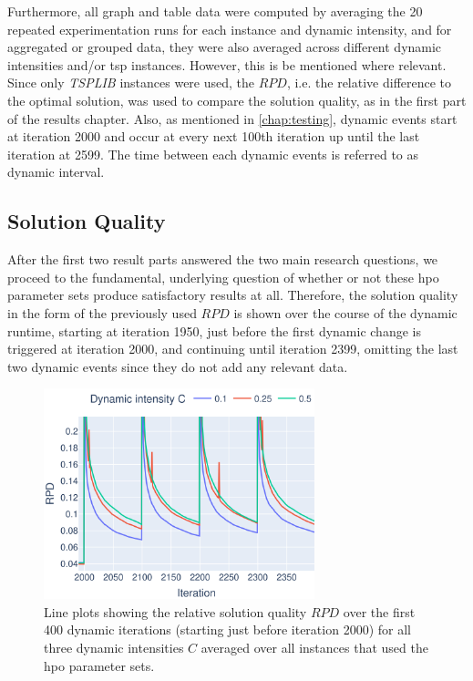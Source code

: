 Furthermore, all graph and table data were computed by averaging the 20 repeated experimentation runs for each instance and dynamic intensity, and for aggregated or grouped data, they were also averaged across different dynamic intensities and/or \gls{tsp} instances. However, this is be mentioned where relevant. Since only \textit{TSPLIB} instances were used, the $RPD$, i.e. the relative difference to the optimal solution, was used to compare the solution quality, as in the first part of the results chapter. Also, as mentioned in \cref{chap:testing}, dynamic events start at iteration 2000 and occur at every next 100th iteration up until the last iteration at 2599. The time between each dynamic events is referred to as dynamic interval.

\subsection{Solution Quality}

After the first two result parts answered the two main research questions, we proceed to the fundamental, underlying question of whether or not these \gls{hpo} parameter sets produce satisfactory results at all. Therefore, the solution quality in the form of the previously used $RPD$ is shown over the course of the dynamic runtime, starting at iteration 1950, just before the first dynamic change is triggered at iteration 2000, and continuing until iteration 2399, omitting the last two dynamic events since they do not add any relevant data. 


\begin{figure}[h]
	\centering
	\includegraphics[width=0.7\textwidth]{results/part3/run_plot_cmp_dynamic_aggr_None_y_best_solution_1_to_30_HPO.svg}
	\caption[Line plots showing the $RPD$ over the dynamic iterations for all three dynamic intensities $C$]{Line plots showing the relative solution quality $RPD$ over the first 400 dynamic iterations (starting just before iteration 2000) for all three dynamic intensities $C$ averaged over all instances that used the \gls{hpo} parameter sets.}
	\label{fig:run_plot_cmp_dynamic_HPO}
\end{figure}

